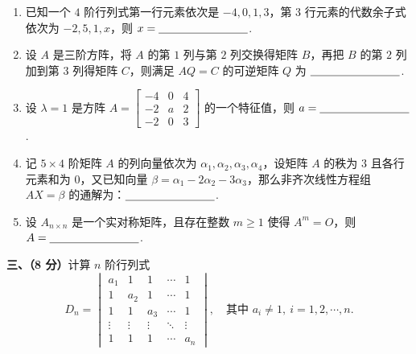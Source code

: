 \documentclass[a4paper,11pt]{ctexart}
\newcommand{\blank}[1][2.8cm]{\underline{\hspace{#1}}}
\begin{document}
\begin{enumerate}[label=\arabic*., leftmargin=2em, itemsep=0.9em, topsep=0.5em]
  \item 已知一个 $4$ 阶行列式第一行元素依次是 $-4, 0, 1, 3$，第 $3$ 行元素的代数余子式依次为 $-2, 5, 1, x$，则 $x = \blank$.

  \item 设 $A$ 是三阶方阵，将 $A$ 的第 $1$ 列与第 $2$ 列交换得矩阵 $B$，再把 $B$ 的第 $2$ 列加到第 $3$ 列得矩阵 $C$，则满足 $AQ = C$ 的可逆矩阵 $Q$ 为 $\blank$.

  \item 设 $\lambda = 1$ 是方阵 $A = \begin{bmatrix} -4 & 0 & 4 \\ -2 & a & 2 \\ -2 & 0 & 3 \end{bmatrix}$ 的一个特征值，则 $a = \blank$.

  \item 记 $5 \times 4$ 阶矩阵 $A$ 的列向量依次为 $\alpha_1, \alpha_2, \alpha_3, \alpha_4$，设矩阵 $A$ 的秩为 $3$ 且各行元素和为 $0$，又已知向量 $\beta = \alpha_1 - 2\alpha_2 - 3\alpha_3$，那么非齐次线性方程组 $AX = \beta$ 的通解为：$\blank$.

  \item 设 $A_{n \times n}$ 是一个实对称矩阵，且存在整数 $m \geqslant 1$ 使得 $A^m = O$，则 $A = \blank$.
\end{enumerate}

\vspace{0.9em}

\textbf{三、（8 分）}计算 $n$ 阶行列式
\[
  D_n = \begin{vmatrix}
    a_1 & 1 & 1 & \cdots & 1 \\
    1 & a_2 & 1 & \cdots & 1 \\
    1 & 1 & a_3 & \cdots & 1 \\
    \vdots & \vdots & \vdots & \ddots & \vdots \\
    1 & 1 & 1 & \cdots & a_n
  \end{vmatrix},
  \quad\text{其中 } a_i \neq 1,\ i = 1, 2, \cdots, n.
\]

\vspace{0.7em}
\end{document}
